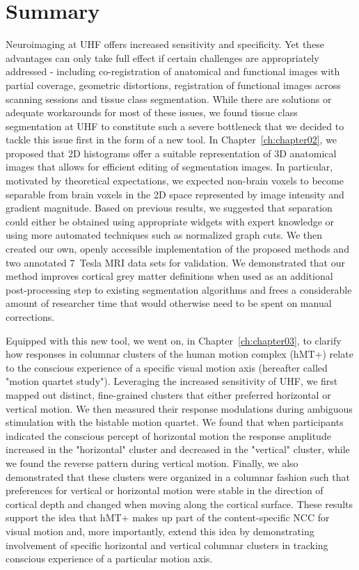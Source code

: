 \section{Summary}
Neuroimaging at UHF offers increased sensitivity and specificity. Yet these advantages can only take full effect if certain challenges are appropriately addressed - including co-registration of anatomical and functional images with partial coverage, geometric distortions, registration of functional images across scanning sessions and tissue class segmentation. While there are solutions or adequate workarounds for most of these issues, we found tissue class segmentation at UHF to constitute such a severe bottleneck that we decided to tackle this issue first in the form of a new tool. In Chapter~\ref{ch:chapter02}, we proposed that 2D histograms offer a suitable representation of 3D anatomical images that allows for efficient editing of segmentation images. In particular, motivated by theoretical expectations, we expected non-brain voxels to become separable from brain voxels in the 2D space represented by image intensity and gradient magnitude. Based on previous results, we suggested that separation could either be obtained using appropriate widgets with expert knowledge or using more automated techniques such as normalized graph cuts. We then created our own, openly accessible implementation of the proposed methods and two annotated 7~Tesla MRI data sets for validation. We demonstrated that our method improves cortical grey matter definitions when used as an additional post-processing step to existing segmentation algorithms and frees a considerable amount of researcher time that would otherwise need to be spent on manual corrections. 

Equipped with this new tool, we went on, in Chapter~\ref{ch:chapter03}, to clarify how responses in columnar clusters of the human motion complex (hMT+) relate to the conscious experience of a specific visual motion axis (hereafter called "motion quartet study"). Leveraging the increased sensitivity of UHF, we first mapped out distinct, fine-grained clusters that either preferred horizontal or vertical motion. We then measured their response modulations during ambiguous stimulation with the bistable motion quartet. We found that when participants indicated the conscious percept of horizontal motion the response amplitude increased in the "horizontal" cluster and decreased in the "vertical" cluster, while we found the reverse pattern during vertical motion. Finally, we also demonstrated that these clusters were organized in a columnar fashion such that preferences for vertical or horizontal motion were stable in the direction of cortical depth and changed when moving along the cortical surface. These results support the idea that hMT+ makes up part of the content-specific NCC for visual motion and, more importantly, extend this idea by demonstrating involvement of specific horizontal and vertical columnar clusters in tracking conscious experience of a particular motion axis.

